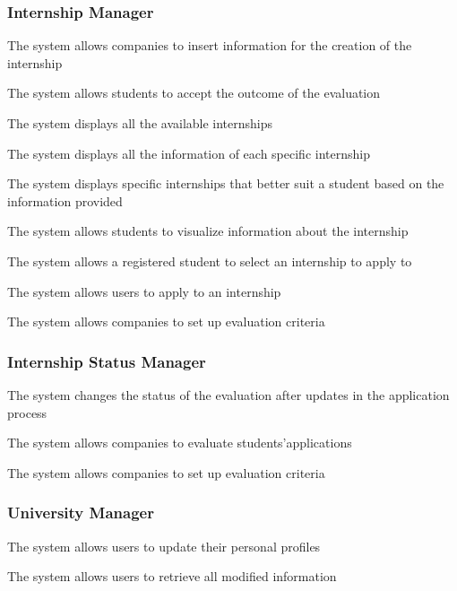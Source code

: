 \subsubsection*{Internship Manager}
\begin{enumerate}[label={\textbf{[R\arabic*]}}, leftmargin=1.35cm]
    \setcounter{enumi}{3}
    \item The system allows companies to insert information for the creation of the internship
    \setcounter{enumi}{10}
    \item The system allows students to accept the outcome of the evaluation
    \setcounter{enumi}{12}
    \item The system displays all the available internships
    \item The system displays all the information of each specific internship
    \item The system displays specific internships that better suit a student based on the information provided
    \item The system allows students to visualize information about the internship
    \item The system allows a registered student to select an internship to apply to
    \item The system allows users to apply to an internship
    \item The system allows companies to set up evaluation criteria
\end{enumerate}

\subsubsection*{Internship Status Manager}
\begin{enumerate}[label={\textbf{[R\arabic*]}}, leftmargin=1.35cm]
    \setcounter{enumi}{9}
    \item The system changes the status of the evaluation after updates in the application process
    \setcounter{enumi}{11}
    \item The system allows companies to evaluate students'applications
    \setcounter{enumi}{18}
    \item The system allows companies to set up evaluation criteria
\end{enumerate}


\subsubsection*{University Manager}
\begin{enumerate}[label={\textbf{[R\arabic*]}}, leftmargin=1.35cm]
    \setcounter{enumi}{4}
    \item The system allows users to update their personal profiles
    \setcounter{enumi}{6}
    \item The system allows users to retrieve all modified information
\end{enumerate}

